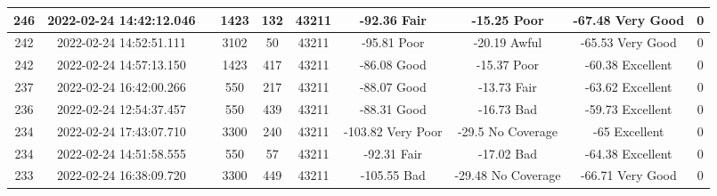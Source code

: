 \begin{longtable*}{|c|c|c|c|c|c|c|c|c|c|}
246&2022-02-24 14:42:12.046&&1423&132&43211& -92.36    Fair        & -15.25    Poor        & -67.48    Very Good   & 0\\\hline
{}242&2022-02-24 14:52:51.111&&3102&50&43211& -95.81    Poor        & -20.19    Awful       & -65.53    Very Good   & 0\\\hline
{}242&2022-02-24 14:57:13.150&&1423&417&43211& -86.08    Good        & -15.37    Poor        & -60.38    Excellent   & 0\\\hline
{}237&2022-02-24 16:42:00.266&&550&217&43211& -88.07    Good        & -13.73    Fair        & -63.62    Excellent   & 0\\\hline
{}236&2022-02-24 12:54:37.457&&550&439&43211& -88.31    Good        & -16.73    Bad         & -59.73    Excellent   & 0\\\hline
{}234&2022-02-24 17:43:07.710&&3300&240&43211& -103.82   Very Poor   & -29.5     No Coverage & -65       Excellent   & 0\\\hline
{}234&2022-02-24 14:51:58.555&&550&57&43211& -92.31    Fair        & -17.02    Bad         & -64.38    Excellent   & 0\\\hline
{}233&2022-02-24 16:38:09.720&&3300&449&43211& -105.55   Bad         & -29.48    No Coverage & -66.71    Very Good   & 0\\\hline

\end{longtable*}
